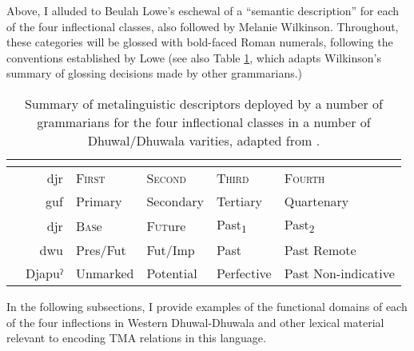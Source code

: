 Above, I alluded to Beulah Lowe's eschewal of a ``semantic description'' for each of the four inflectional classes, also followed by Melanie Wilkinson. Throughout, these categories will be glossed with bold-faced Roman numerals, following the conventions established by Lowe (see also Table \ref{Infl-Comparisons-Wilk}, which adapts Wilkinson's summary of glossing decisions made by other grammarians.)%


\begin{table}[h]
	\caption{Summary of metalinguistic descriptors deployed by a number of grammarians for the four inflectional classes in a number of Dhuwal/Dhuwala varities, adapted from \citet[336]{Wilkinson1991}.}\label{Infl-Comparisons-Wilk}\small
	\begin{tabular}{lr|llll}
		&&	\textbf{\I}	& \textbf{\II}	&	\textbf{\III}	&	\textbf{\IV}\\\midrule
		\citealt{Wilkinson1991}& \gls{djr} &\textsc{First}&\textsc{Second}&\textsc{Third}&\textsc{Fourth}\\
		\citealt{Lowe1996}\footnotemark &\gls{guf} &Primary&Secondary&Tertiary&Quartenary\\
		\citealt{Tchekhoff1983}& \gls{djr}&\textsc{Bas}e&\textsc{Fut}ure&Past\textsubscript1&Past\textsubscript2\\
		\citealt{Heath1980}& \gls{dwu} & Pres/Fut & Fut/Imp & Past & Past Remote\\
		\citealt{Morphy1983}& \footnotesize Djapuˀ & Unmarked & Potential & Perfective & Past Non-indicative\\
	\end{tabular}
	
\end{table}	

 In the following subsections, I provide examples of the functional domains of each of the four inflections in Western Dhuwal-Dhuwala and other lexical material relevant to encoding TMA relations in this language.

